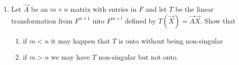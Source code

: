 \begin{enumerate}[label=\thesubsection.\arabic*.,ref=\thesubsection.\theenumi]
%
\item Let $\vec{A}$ be an $m \times n$ matrix with entries in $F$ and let $T$ be the linear transformation from $F^{n \times1 }$ into $F^{m \times l}$ defined by $T(\vec{X}) = \vec{A}\vec{X}$. Show that 
\begin{enumerate}
\item
if $m < n$ it may happen that $T$ is onto without being non-singular
\item
if $m>n$ we may have $T$ non-singular but not onto.
\\
\end{enumerate}
%
\solution

\end{enumerate}

